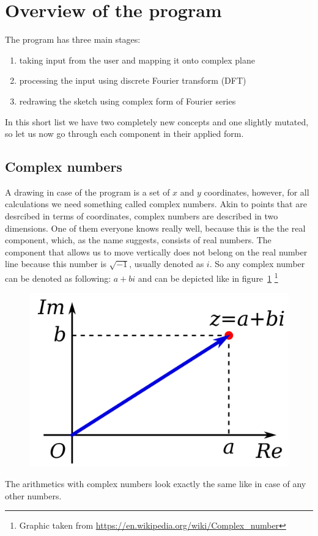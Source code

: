 \documentclass{article}
\begin{document}
\section{Overview of the program} 

    The program has three main stages:
    \begin{enumerate}
        \item taking input from the user and mapping it onto complex plane
        \item processing the input using discrete Fourier transform (DFT)
        \item redrawing the sketch using complex form of Fourier series
    \end{enumerate}

    In this short list we have two completely new concepts and one slightly 
    mutated, so let us now go through each component in their applied form.

\subsection{Complex numbers}

    A drawing in case of the program is a set of $x$ and $y$ coordinates, however,
    for all calculations we need something called complex numbers. Akin to points
    that are desrcibed in terms of coordinates, complex numbers are described in
    two dimensions. One of them everyone knows really well, because this is the 
    the real component, which, as the name suggests, consists of real numbers.
    The component that allows us to move vertically does not belong on the real 
    number line because this number is $\sqrt{-1}$, usually denoted as $i$. So
    any complex number can be denoted as following: $a + bi$ and can be depicted
    like in figure~\ref{fig:complex_number}
    \footnote{Graphic taken from \url{https://en.wikipedia.org/wiki/Complex_number}}
    \begin{figure}[H]
        \caption{}
        \centering
        \includegraphics[width=0.3\linewidth]{imaginary_number}
        \label{fig:complex_number}
    \end{figure}
    The arithmetics with complex numbers look exactly the same like in case of 
    any other numbers.
    
\end{document}
